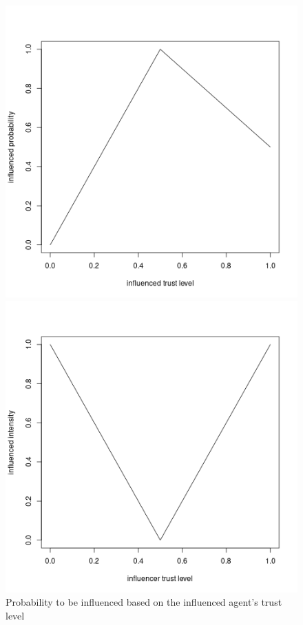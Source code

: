 \begin{figure}[!htb]
    \centering
        \includegraphics[width=\linewidth]{pics/influenced_probability.png}
        \caption{Probability to be influenced based on the influenced agent's trust level}
        \label{fig:influenced_probability}
    \endminipage
    \hspace{0.2in}
        \includegraphics[width=\linewidth]{pics/influence_intensity.png}

\end{figure}
